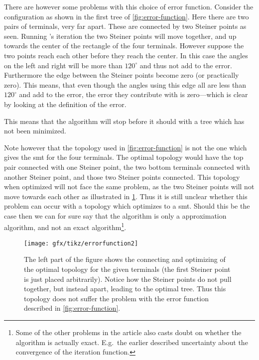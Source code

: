 There are however some problems with this choice of error function. Consider the
configuration as shown in the first tree of \cref{fig:error-function}. Here
there are two pairs of terminals, very far apart. These are connected by two
Steiner points as seen. Running \citeauthor{smith1992}'s iteration the two
Steiner points will move together, and up towards the center of the rectangle of
the four terminals. However suppose the two points reach each other before they
reach the center. In this case the angles on the left and right will be more
than $120^{\circ}$ and thus not add to the error. Furthermore the edge between
the Steiner points become zero (or practically zero). This means, that even
though the angles using this edge all are less than $120^{\circ}$ and add to the
error, the error they contribute with is zero---which is clear by looking at the
definition of the error.

This means that the algorithm will stop before it should with a tree which has
not been minimized.

Note however that the topology used in \cref{fig:error-function} is not the one
which gives the \ac{smt} for the four terminals. The optimal topology would have
the top pair connected with one Steiner point, the two bottom terminals
connected with another Steiner point, and those two Steiner points
connected. This topology when optimized will not face the same problem, as the
two Steiner points will not move towards each other as illustrated in
\cref{fig:error-function2}. Thus it is still unclear whether this problem can
occur with a topology which optimizes to a \ac{smt}.  Should this be the case
then we can for sure say that the algorithm is only a approximation algorithm,
and not an exact algorithm\footnote{Some of the other problems in the article
  also casts doubt on whether the algorithm is actually exact. E.g.\ the earlier
described uncertainty about the convergence of the iteration function.}.

\begin{figure}[htbp]
  \centering
  \texttt{[image: gfx/tikz/errorfunction2]}
  \caption[Possible problem with the error function, part 2]{The left part of the figure
    shows the connecting and optimizing of the optimal topology for the given
    terminals (the first Steiner point is just placed arbitrarily). Notice how
    the Steiner points do not pull together, but instead apart, leading to the
    optimal tree. Thus this topology does not suffer the problem with the error
    function described in \cref{fig:error-function}.\label{fig:error-function2}}
\end{figure}

